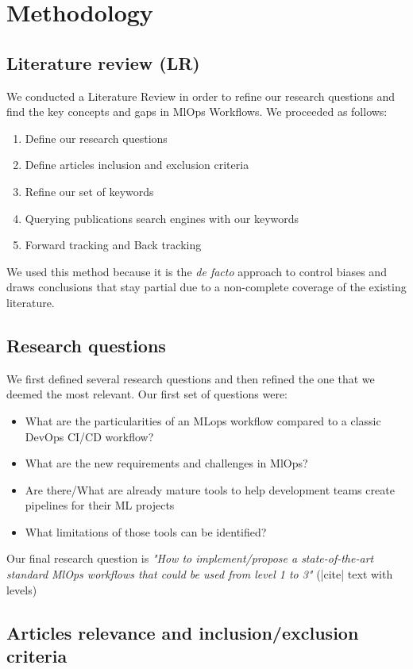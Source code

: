 \section{Methodology}\label{sec:methodo}
\subsection{Literature review (LR)}

We conducted a Literature Review in order to refine our research questions and find the key concepts and gaps in MlOps Workflows.
We proceeded as follows:

\begin{enumerate}
    \item Define our research questions
    \item Define articles inclusion and exclusion criteria
    \item Refine our set of keywords
    \item Querying publications search engines with our keywords
    \item Forward tracking and Back tracking
\end{enumerate}

We used this method because it is the \textit{de facto} approach to control biases and draws conclusions that stay partial due to
a non-complete coverage of the existing literature.

\subsection{Research questions}

We first defined several research questions and then refined the one that we deemed the most relevant.
Our first set of questions were:
\begin{itemize}
    \item What are the particularities of an MLops workflow compared to a classic DevOps CI/CD workflow?
    \item What are the new requirements and challenges in MlOps?
    \item Are there/What are already mature tools to help development teams create pipelines for their ML projects
    \item What limitations of those tools can be identified?
\end{itemize}

Our final research question is
\textit{"How to implement/propose a state-of-the-art standard MlOps workflows that could be used from level 1 to 3"} (|cite| text with levels)

\subsection{Articles relevance and inclusion/exclusion criteria}

